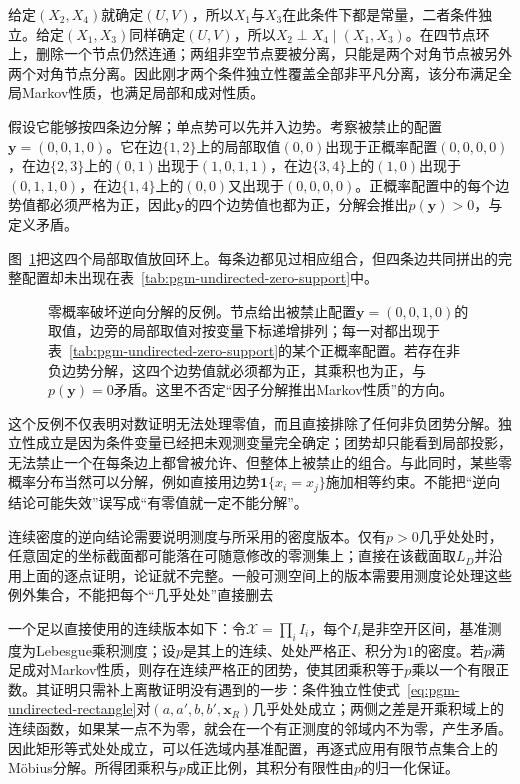 给定$(X_2,X_4)$就确定$(U,V)$，所以$X_1$与$X_3$在此条件下都是常量，二者条件独立。给定$(X_1,X_3)$同样确定$(U,V)$，所以$X_2\perp X_4\mid(X_1,X_3)$。在四节点环上，删除一个节点仍然连通；两组非空节点要被分离，只能是两个对角节点被另外两个对角节点分离。因此刚才两个条件独立性覆盖全部非平凡分离，该分布满足全局Markov性质，也满足局部和成对性质。

假设它能够按四条边分解；单点势可以先并入边势。考察被禁止的配置$\bm{y}=(0,0,1,0)$。它在边$\{1,2\}$上的局部取值$(0,0)$出现于正概率配置$(0,0,0,0)$，在边$\{2,3\}$上的$(0,1)$出现于$(1,0,1,1)$，在边$\{3,4\}$上的$(1,0)$出现于$(0,1,1,0)$，在边$\{1,4\}$上的$(0,0)$又出现于$(0,0,0,0)$。正概率配置中的每个边势值都必须严格为正，因此$\bm{y}$的四个边势值也都为正，分解会推出$p(\bm{y})>0$，与定义矛盾。

图~\ref{fig:pgm-undirected-zero-support}把这四个局部取值放回环上。每条边都见过相应组合，但四条边共同拼出的完整配置却未出现在表~\ref{tab:pgm-undirected-zero-support}中。
\begin{figure}[htbp]
  \centering
  
  \caption{零概率破坏逆向分解的反例。节点给出被禁止配置$\bm y=(0,0,1,0)$的取值，边旁的局部取值对按变量下标递增排列；每一对都出现于表~\ref{tab:pgm-undirected-zero-support}的某个正概率配置。若存在非负边势分解，这四个边势值就必须都为正，其乘积也为正，与$p(\bm y)=0$矛盾。这里不否定“因子分解推出Markov性质”的方向。}
  \label{fig:pgm-undirected-zero-support}
\end{figure}

这个反例不仅表明对数证明无法处理零值，而且直接排除了任何非负团势分解。独立性成立是因为条件变量已经把未观测变量完全确定；团势却只能看到局部投影，无法禁止一个在每条边上都曾被允许、但整体上被禁止的组合。与此同时，某些零概率分布当然可以分解，例如直接用边势$\mathbf{1}\{x_i=x_j\}$施加相等约束。不能把“逆向结论可能失效”误写成“有零值就一定不能分解”。

连续密度的逆向结论需要说明测度与所采用的密度版本。仅有$p>0$几乎处处时，任意固定的坐标截面都可能落在可随意修改的零测集上；直接在该截面取$L_D$并沿用上面的逐点证明，论证就不完整。一般可测空间上的版本需要用测度论处理这些例外集合，不能把每个“几乎处处”直接删去

一个足以直接使用的连续版本如下：令$\mathcal{X}=\prod_i I_i$，每个$I_i$是非空开区间，基准测度为Lebesgue乘积测度；设$p$是其上的连续、处处严格正、积分为$1$的密度。若$p$满足成对Markov性质，则存在连续严格正的团势，使其团乘积等于$p$乘以一个有限正数。其证明只需补上离散证明没有遇到的一步：条件独立性使式~\eqref{eq:pgm-undirected-rectangle}对$(a,a',b,b',\bm{x}_R)$几乎处处成立；两侧之差是开乘积域上的连续函数，如果某一点不为零，就会在一个有正测度的邻域内不为零，产生矛盾。因此矩形等式处处成立，可以任选域内基准配置，再逐式应用有限节点集合上的Möbius分解。所得团乘积与$p$成正比例，其积分有限性由$p$的归一化保证。

